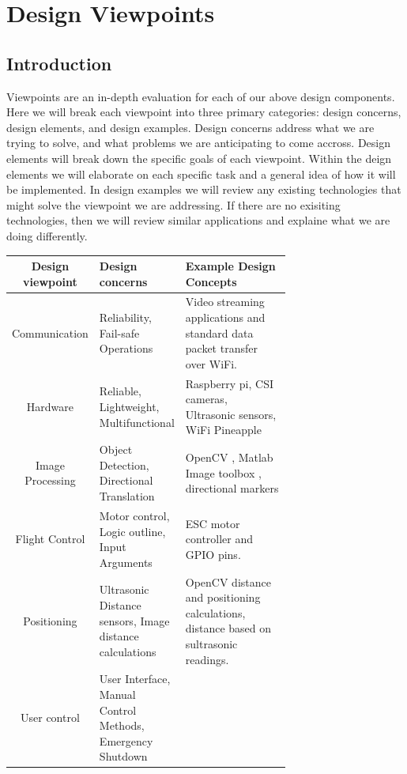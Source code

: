 \documentclass[onecolumn, draftclsnofoot,10pt, compsoc]{IEEEtran}
\begin{document}
\section{Design Viewpoints} %

\subsection{Introduction}  
	Viewpoints are an in-depth evaluation for each of our above design components. Here we will break each viewpoint into three primary categories: design concerns, design elements, and design examples. Design concerns address what we are trying to solve, and what problems we are anticipating to come accross. Design elements will break down the specific goals of each viewpoint. Within the deign elements we will elaborate on each specific task and a general idea of how it will be implemented. In design examples we will review any existing technologies that might solve the viewpoint we are addressing. If there are no exisiting technologies, then we will review similar applications and explaine what we are doing differently. 



\begin{center}
    \begin{tabular}{|c|p{0.3\linewidth}|p{0.4\linewidth}|}
        \hline
		Design viewpoint & Design concerns & Example Design Concepts \\
        \hline
		Communication & Reliability, Fail-safe Operations  & Video streaming applications and standard data packet transfer over WiFi.  \\
		\hline 
        Hardware & Reliable, Lightweight, Multifunctional & Raspberry pi, CSI cameras, Ultrasonic sensors, WiFi Pineapple\\
		\hline 
        Image Processing & Object Detection, Directional Translation & OpenCV \cite{r8}, Matlab Image toolbox \cite{r9}, directional markers  \\
		\hline 
        Flight Control & Motor control, Logic outline, Input Arguments  & ESC motor controller and GPIO pins.  \\
		\hline 
        Positioning & Ultrasonic Distance sensors, Image distance calculations  & OpenCV distance and positioning calculations, distance based on sultrasonic readings.  \\
		\hline 
        User control & User Interface, Manual Control Methods, Emergency Shutdown  &   \\
		\hline 
    \end{tabular}
\end{center}
\end{document}
